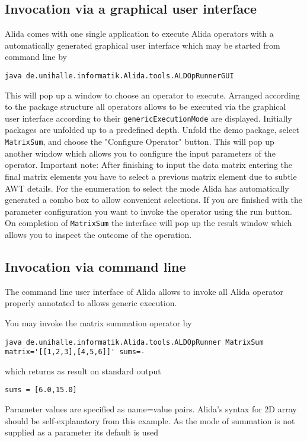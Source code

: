\subsection{ Invocation via a graphical user interface}

Alida comes with one single application to execute Alida operators
with a automatically generated graphical user interface which may be
started from command line by

\lstinline+java de.unihalle.informatik.Alida.tools.ALDOpRunnerGUI+

This will pop up a window to choose an operator to execute.
Arranged according to the package structure all operators allows to be executed
via the graphical user interface according to their \lstinline+genericExecutionMode+
are displayed.
Initially packages are unfolded up to a predefined depth.
Unfold the demo package, select \lstinline+MatrixSum+, and choose the "Configure Operator" button.
This will pop up another window which allows you to configure the input parameters
of the operator.
Important note: After finishing to input the data matrix entering the final matrix elements
you have to select a previous matrix element due to subtle AWT details.
For the enumeration to select the mode Alida has automatically generated
a combo box to allow convenient selections.
If you are finished with the parameter configuration you want to invoke the operator
using the run button.
On completion of \lstinline+MatrixSum+ the interface will pop up the result window which allows you
to inspect the outcome of the operation.

\subsection{  Invocation via command line}

The command line user interface of Alida allows to invoke all Alida operator
properly annotated to allows generic execution.

You may invoke the matrix summation operator by

\lstinline+java de.unihalle.informatik.Alida.tools.ALDOpRunner MatrixSum matrix='[[1,2,3],[4,5,6]]' sums=-+

which returns as result on standard output

\lstinline+sums = [6.0,15.0]+

Parameter values are specified as name=value pairs.
Alida's syntax for 2D array should be self-explanatory  from this example.
As the mode of summation is not supplied as a parameter its default is used

